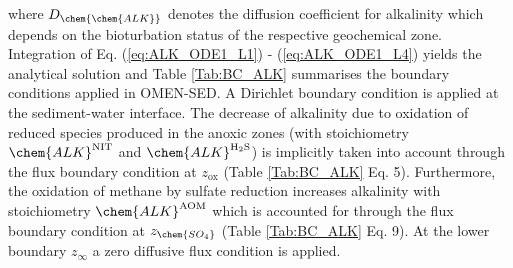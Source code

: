 \documentclass[gmd, manuscript]{copernicus}
\begin{document}
where $D_\chem{\chem{ALK}}$ denotes the diffusion coefficient for alkalinity which depends on the bioturbation status of the respective geochemical zone. 
Integration of Eq. (\ref{eq:ALK_ODE1_L1}) - (\ref{eq:ALK_ODE1_L4}) yields the analytical solution and Table \ref{Tab:BC_ALK} summarises the boundary conditions applied in OMEN-SED. 
A Dirichlet boundary condition is applied at the sediment-water interface. The decrease of alkalinity due to oxidation of reduced species produced in the anoxic zones 
(with stoichiometry $\chem{ALK}^\mathrm{NIT}$ and $\chem{ALK}^\mathrm{H_2S}$) is implicitly taken into account through the flux boundary condition at $z_{\mathrm{ox}}$ (Table \ref{Tab:BC_ALK} Eq. 5). 
Furthermore, the oxidation of methane by sulfate reduction increases alkalinity with stoichiometry $\chem{ALK}^\mathrm{AOM}$ which is accounted for through the flux boundary condition at $z_{\chem{SO_4}}$ (Table \ref{Tab:BC_ALK} Eq. 9). 
At the lower boundary $z_\infty$ a zero diffusive flux condition is applied. 
\end{document}
